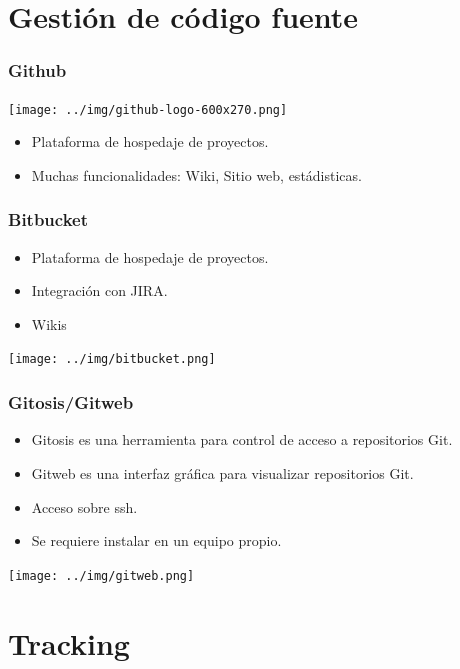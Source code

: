 \documentclass{beamer}
\begin{document}
\section{Gesti\'on de c\'odigo fuente}

\begin{frame}
\frametitle{Github}    
        \begin{center}
                 \texttt{[image: ../img/github-logo-600x270.png]}
        \end{center}
		\begin{itemize}
			\pause \item Plataforma de hospedaje de proyectos.
			\pause \item Muchas funcionalidades: Wiki, Sitio web, est\'adisticas.
		\end{itemize}
\end{frame}

\begin{frame}
\frametitle{Bitbucket}
		\begin{itemize}
			\pause \item Plataforma de hospedaje de proyectos.
			\pause \item Integraci\'on con JIRA.
			\pause \item Wikis
		\end{itemize}
		\begin{center}
                 \texttt{[image: ../img/bitbucket.png]}
        \end{center}
\end{frame}


\begin{frame}
\frametitle{Gitosis/Gitweb}
\begin{itemize}
			\pause \item Gitosis es una herramienta para control de acceso a repositorios Git.
			\pause \item Gitweb es una interfaz gr\'afica para visualizar repositorios Git.
			\pause \item Acceso sobre ssh.
			\pause \item Se requiere instalar en un equipo propio.
		\end{itemize}
        \begin{center}
                 \texttt{[image: ../img/gitweb.png]}
        \end{center}
\end{frame}

\section {Tracking}
\end{document}
